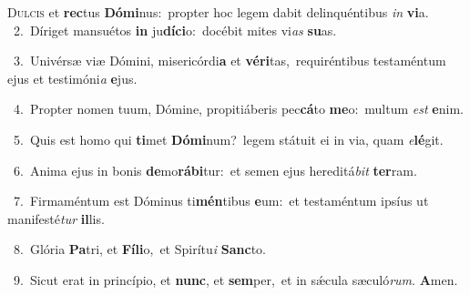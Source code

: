 \lettrine{\initial\textcolor{\initialcolor}{D}}{ulcis} et \textbf{rec}\-tus \textbf{Dó}\-\textbf{mi}nus:~\star propter hoc legem dabit delinquéntibus \textit{in} \textbf{vi}\-a.\\
{\numbfont\textcolor{\numbcolor}{~2.}}~Díriget mansuétos \textbf{in} ju\-\textbf{dí}\-\textbf{ci}o:~\star docébit mites vi\textit{as} \textbf{su}\-as.\par
{\numbfont\textcolor{\numbcolor}{~3.}}~Univérsæ viæ Dómini, misericórdi\textbf{a} et \textbf{vé}\-\textbf{ri}tas,~\star requiréntibus testaméntum ejus et testimóni\textit{a} \textbf{e}\-jus.\par
{\numbfont\textcolor{\numbcolor}{~4.}}~Propter nomen tuum, Dómine, propitiáberis pec\-\textbf{cá}\-to \textbf{me}\-o:~\star multum \textit{est} \textbf{e}\-nim.\par
{\numbfont\textcolor{\numbcolor}{~5.}}~Quis est homo qui \textbf{ti}\-met \textbf{Dó}\-\textbf{mi}num?~\star legem státuit ei in via, quam \textit{e}\-\textbf{lé}git.\par
{\numbfont\textcolor{\numbcolor}{~6.}}~Anima ejus in bonis \textbf{de}\-mo\-\textbf{rá}\-\textbf{bi}tur:~\star et semen ejus hereditá\textit{bit} \textbf{ter}\-ram.\par
{\numbfont\textcolor{\numbcolor}{~7.}}~Firmaméntum est Dóminus ti\-\textbf{mén}\-tibus \textbf{e}\-um:~\star et testaméntum ipsíus ut manifesté\textit{tur} \textbf{il}\-lis.\par
{\numbfont\textcolor{\numbcolor}{~8.}}~Glória \textbf{Pa}\-tri, et \textbf{Fí}\-\textbf{li}o,~\star et Spirítu\textit{i} \textbf{Sanc}\-to.\par
{\numbfont\textcolor{\numbcolor}{~9.}}~Sicut erat in princípio, et \textbf{nunc}\-, et \textbf{sem}\-per,~\star et in sǽcula sæculó\-\textit{rum}\-. \textbf{A}\-men.\par
